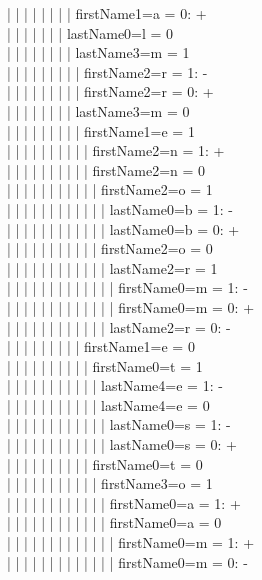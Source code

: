 \begin{enumerate}
|  |  |  |  |  |  |  |  firstName1=a = 0: +\\
|  |  |  |  |  |  |  lastName0=l = 0\\
|  |  |  |  |  |  |  |  lastName3=m = 1\\
|  |  |  |  |  |  |  |  |  firstName2=r = 1: -\\
|  |  |  |  |  |  |  |  |  firstName2=r = 0: +\\
|  |  |  |  |  |  |  |  lastName3=m = 0\\
|  |  |  |  |  |  |  |  |  firstName1=e = 1\\
|  |  |  |  |  |  |  |  |  |  firstName2=n = 1: +\\
|  |  |  |  |  |  |  |  |  |  firstName2=n = 0\\
|  |  |  |  |  |  |  |  |  |  |  firstName2=o = 1\\
|  |  |  |  |  |  |  |  |  |  |  |  lastName0=b = 1: -\\
|  |  |  |  |  |  |  |  |  |  |  |  lastName0=b = 0: +\\
|  |  |  |  |  |  |  |  |  |  |  firstName2=o = 0\\
|  |  |  |  |  |  |  |  |  |  |  |  lastName2=r = 1\\
|  |  |  |  |  |  |  |  |  |  |  |  |  firstName0=m = 1: -\\
|  |  |  |  |  |  |  |  |  |  |  |  |  firstName0=m = 0: +\\
|  |  |  |  |  |  |  |  |  |  |  |  lastName2=r = 0: -\\
|  |  |  |  |  |  |  |  |  firstName1=e = 0\\
|  |  |  |  |  |  |  |  |  |  firstName0=t = 1\\
|  |  |  |  |  |  |  |  |  |  |  lastName4=e = 1: -\\
|  |  |  |  |  |  |  |  |  |  |  lastName4=e = 0\\
|  |  |  |  |  |  |  |  |  |  |  |  lastName0=s = 1: -\\
|  |  |  |  |  |  |  |  |  |  |  |  lastName0=s = 0: +\\
|  |  |  |  |  |  |  |  |  |  firstName0=t = 0\\
|  |  |  |  |  |  |  |  |  |  |  firstName3=o = 1\\
|  |  |  |  |  |  |  |  |  |  |  |  firstName0=a = 1: +\\
|  |  |  |  |  |  |  |  |  |  |  |  firstName0=a = 0\\
|  |  |  |  |  |  |  |  |  |  |  |  |  firstName0=m = 1: +\\
|  |  |  |  |  |  |  |  |  |  |  |  |  firstName0=m = 0: -\\

\end{enumerate}
